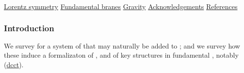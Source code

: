 \noindent\hyperlink{lorentz_symmetry}{Lorentz symmetry}\dotfill \pageref*{lorentz_symmetry} \linebreak
\noindent\hyperlink{fundamental_branes}{Fundamental branes}\dotfill \pageref*{fundamental_branes} \linebreak
\noindent\hyperlink{gravity}{Gravity}\dotfill \pageref*{gravity} \linebreak
\noindent\hyperlink{acknowledgements}{Acknowledgements}\dotfill \pageref*{acknowledgements} \linebreak
\noindent\hyperlink{references}{References}\dotfill \pageref*{references} \linebreak
\hypertarget{introduction}{}\subsubsection*{{Introduction}}\label{introduction}
We survey  for a system of  that may naturally be added to ; and we survey how these induce a  formalizaton of ,  and of key structures in fundamental , notably     (\hyperlink{dcct}{dcct}).

